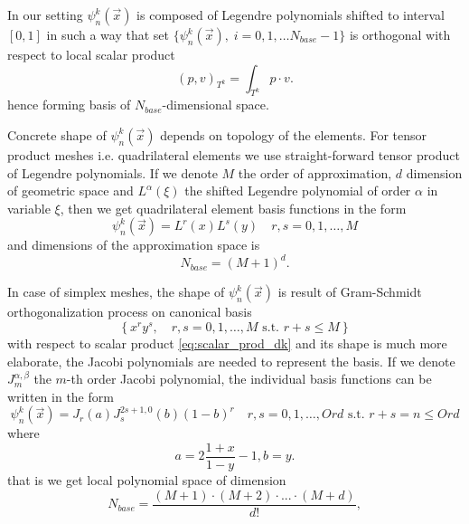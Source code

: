 In our setting $\psi_n^k(\vec{x})$ is composed of Legendre polynomials shifted 
to interval $[0, 1]$ in such a way that set $\{\psi_n^k(\vec{x}),\; i = 0,1, 
\dots  N_{base} - 1\}$ is orthogonal with respect to local scalar product
\begin{equation}
	\label{eq:scalar_prod_dk}
	(p, v)_{T^k} = \int_{T^k} p \cdot v.
\end{equation}
hence forming basis of $N_{base}$-dimensional space. 


Concrete shape of $\psi_n^k(\vec{x})$ depends on topology of the elements. For 
tensor product meshes i.e. quadrilateral elements we use straight-forward 
tensor product of Legendre polynomials. If we denote $M$ the order of 
approximation, $d$ dimension of geometric space and $L^\alpha(\xi)$ the shifted 
Legendre polynomial of order $\alpha$ in variable $\xi$, then we get 
quadrilateral element basis functions in the form
\begin{equation}
\psi_n^k(\vec{x}) = L^r(x)L^s(y)\quad r, s = 0,1, \dots, M
\end{equation}
and dimensions of the approximation space is
\begin{equation}
	N_{base} = (M + 1)^d.
\end{equation}


In case of simplex meshes, the shape of $\psi_n^k(\vec{x})$ is result of 
Gram-Schmidt orthogonalization process on canonical basis 
$$
\left\{ x^ry^s,  \quad r, s = 0,1, \dots, M \text{ s.t. } r + s \leq M\right\}
$$
with respect to scalar product \eqref{eq:scalar_prod_dk}
and its shape is much more elaborate, the Jacobi polynomials are needed to 
represent the basis. If we denote $J^{\alpha, \beta}_m$ the $m$-th order 
Jacobi polynomial, the individual basis functions can be written in the form 
\cite{Hesthaven2008}
\begin{equation}
	\psi_n^k(\vec{x}) = J_r(a)J^{2s+1, 0}_s(b)(1 - b)^r\quad r, s = 0,1, \dots, 
	Ord \text{ s.t. } r + s = n \leq Ord
\end{equation}
where
\begin{equation}
	a = 2 \frac{1 + x}{1 - y} - 1, b = y.
\end{equation}
that is we get local polynomial space of dimension
\begin{equation}
N_{base} =  \frac{(M + 1) \cdot (M + 2) \cdot ... \cdot (M + d)}{d!},
\end{equation}

